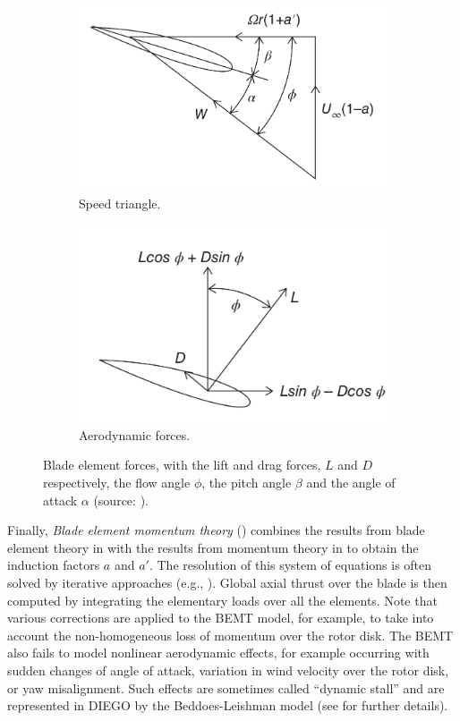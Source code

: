 \begin{figure}[h!]
    \begin{subfigure}[b]{0.5\textwidth}
        \centering
        \includegraphics[width=0.9\linewidth]{./part1/figures/speed_triangle.png}
        \caption{Speed triangle.}
    \end{subfigure}
    \begin{subfigure}[b]{0.5\textwidth}
        \centering
        \includegraphics[width=0.9\linewidth]{./part1/figures/aerodyn_blade.png}
        \caption{Aerodynamic forces.}
    \end{subfigure}
    \caption{Blade element forces, with the lift and drag forces, $L$ and $D$ respectively, the flow angle $\phi$, the pitch angle $\beta$ and the angle of attack $\alpha$ (source: \citealp{burton_2021_wind_handbook}).}
    \label{fig:blade_theory}
\end{figure}
Finally, \textit{Blade element momentum theory} () combines the results from blade element theory in  with the results from momentum theory in  to obtain the induction factors $a$ and $a'$. 
The resolution of this system of equations is often solved by iterative approaches (e.g., \citealp{dai_2011_BEMT}). 
Global axial thrust over the blade is then computed by integrating the elementary loads over all the elements. 
Note that various corrections are applied to the BEMT model, for example, to take into account the non-homogeneous loss of momentum over the rotor disk. 
The BEMT also fails to model nonlinear aerodynamic effects, for example occurring with sudden changes of angle of attack, variation in wind velocity over the rotor disk, or yaw misalignment.
Such effects are sometimes called ``dynamic stall'' and are represented in DIEGO by the Beddoes-Leishman model (see \citealp{burton_2021_wind_handbook} for further details).  

